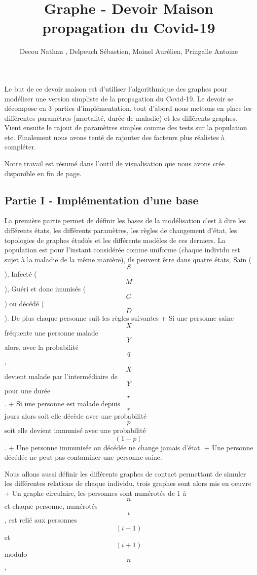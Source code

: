 \documentclass[]{article}
\title{Graphe - Devoir Maison propagation du Covid-19}
\subtitle{Decou Nathan , Delpeuch Sébastien, Moinel Aurélien, Pringalle Antoine}
\date{}
\begin{document}
\maketitle

Le but de ce devoir maison est d'utiliser l'algorithmique des graphes
pour modéliser une version simpliste de la propagation du Covid-19. Le
devoir se décompose en 3 parties d'implémentation, tout d'abord nous
mettons en place les différentes paramètres (mortalité, durée de
maladie) et les différents graphes. Vient ensuite le rajout de
paramètres simples comme des tests sur la population etc. Finalement
nous avons tenté de rajouter des facteurs plus réalistes à compléter.

Notre travail est résumé dans l'outil de visualisation que nous avons
crée disponible en fin de page.

\hypertarget{partie-i---impluxe9mentation-dune-base}{%
\subsection{\texorpdfstring{ Partie I - Implémentation d'une
base}{ Partie I - Implémentation d'une base}}\label{partie-i---impluxe9mentation-dune-base}}

La première partie permet de définir les bases de la modélisation c'est
à dire les différents états, les différents paramètres, les règles de
changement d'état, les topologies de graphes étudiés et les différents
modèles de ces derniers. La population est pour l'instant considérée
comme uniforme (chaque individu est sujet à la maladie de la même
manière), ils peuvent être dans quatre états, Sain (\[S\]), Infecté
(\[M\]), Guéri et donc imunisés (\[G\]) ou décédé (\[D\]). De plus
chaque personne suit les règles suivantes + Si une personne saine \[X\]
fréquente une personne malade \[Y\] alors, avec la probabilité \[q\],
\[X\] devient malade par l'intermédiaire de \[Y\] pour une durée \[r\].
+ Si une personne est malade depuis \[r\] jours alors soit elle décède
avec une probabilité \[p\] soit elle devient immunisé avec une
probabilité \[(1-p)\]. + Une personne immunisée ou décédée ne change
jamais d'état. + Une personne décédée ne peut pas contaminer une
personne saine.

Nous allons aussi définir les différents graphes de contact permettant
de simuler les différentes relations de chaque individu, trois graphes
sont alors mis en oeuvre + Un graphe circulaire, les personnes sont
numérotés de 1 à \[n\] et chaque personne, numérotés \[i\], est relié
aux personnes \[(i-1)\] et \[(i+1)\] modulo \[n\],
\end{document}
